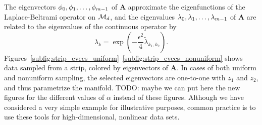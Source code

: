 The eigenvectors $\phi_0, \phi_1, \dots, \phi_{m-1}$ of $\mathbf{A}$ approximate the eigenfunctions of the Laplace-Beltrami operator on $\mathcal{M}_d$,
and the eigenvalues $\lambda_0, \lambda_1, \dots, \lambda_{m-1}$ of $\mathbf{A}$ are related to the eigenvalues of the continuous operator by
\begin{equation} \label{eq:evals_relationship}
\lambda_k = \exp \left( -\frac{\epsilon^2}{4} \tilde{\lambda}_{k_1, k_2}  \right).
\end{equation}
%
Figures~\ref{subfig:strip_evecs_uniform}--\ref{subfig:strip_evecs_nonuniform} shows data sampled from a strip, colored by eigenvectors of $\mathbf{A}$.
%
In cases of both uniform and nonuniform sampling, the selected eigenvectors are one-to-one with $z_1$ and $z_2$, and thus parametrize the manifold.
%
TODO: maybe we can put here the new figures for the different values of $\alpha$ instead of these figures.
%
Although we have considered a very simple example for illustrative purposes, common practice is to use these tools for high-dimensional, nonlinear data sets.

